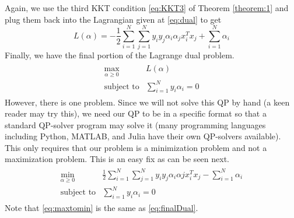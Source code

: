 \documentclass[twoside]{article}
\begin{document}
Again, we use the third KKT condition \textcolor{blue}{\ref{eq:KKT3}} of Theorem \ref{theorem:1} and plug them back into the Lagrangian given at \ref{eq:dual} to get
\begin{equation}
    L(\alpha) = -\frac{1}{2}\sum_{i=1}^{N}\sum_{j=1}^{N}y_{i}y_{j}\alpha_{i}\alpha_{j}x_{i}^{T}x_{j} + \sum_{i=1}^{N}\alpha_{i}
\end{equation}
Finally, we have the final portion of the Lagrange dual problem.
\begin{align} \label{eq:finalDual}
\begin{split}
    \max_{\alpha \geq 0} &L(\alpha)\\
    \text{subject to}
    &\sum_{i=1}^{N}y_{i}\alpha_{i} = 0
\end{split}
\end{align}
However, there is one problem. Since we will not solve this QP by hand (a keen reader may try this), we need our QP to be in a specific format so that a standard QP-solver program may solve it (many programming languages including Python, MATLAB, and Julia have their own QP-solvers available). This only requires that our problem is a minimization problem and not a maximization problem. This is an easy fix as can be seen next.
\begin{align} \label{eq:maxtomin}
\begin{split}
    \min_{\alpha \geq 0} &\frac{1}{2}\sum_{i=1}^{N}\sum_{j=1}^{N}y_{i}y_{j}\alpha_{i}\alpha{j}x_{i}^{T}x_{j} - \sum_{i=1}^{N}\alpha_{i}\\
    \text{subject to}
    &\sum_{i=1}^{N}y_{i}\alpha_{i} = 0
\end{split}
\end{align}
Note that \ref{eq:maxtomin} is the same as \ref{eq:finalDual}.
\end{document}
